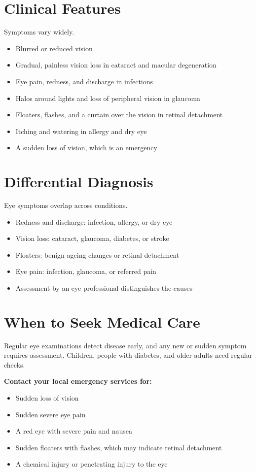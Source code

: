 \section*{Clinical Features}
Symptoms vary widely.
\begin{itemize}
    \item Blurred or reduced vision
    \item Gradual, painless vision loss in cataract and macular degeneration
    \item Eye pain, redness, and discharge in infections
    \item Halos around lights and loss of peripheral vision in glaucoma
    \item Floaters, flashes, and a curtain over the vision in retinal detachment
    \item Itching and watering in allergy and dry eye
    \item A sudden loss of vision, which is an emergency
\end{itemize}

\section*{Differential Diagnosis}
Eye symptoms overlap across conditions.
\begin{itemize}
    \item Redness and discharge: infection, allergy, or dry eye
    \item Vision loss: cataract, glaucoma, diabetes, or stroke
    \item Floaters: benign ageing changes or retinal detachment
    \item Eye pain: infection, glaucoma, or referred pain
    \item Assessment by an eye professional distinguishes the causes
\end{itemize}

\section*{When to Seek Medical Care}
Regular eye examinations detect disease early, and any new or sudden symptom requires assessment. Children, people with diabetes, and older adults need regular checks.

\textbf{Contact your local emergency services for:}
\begin{itemize}
    \item Sudden loss of vision
    \item Sudden severe eye pain
    \item A red eye with severe pain and nausea
    \item Sudden floaters with flashes, which may indicate retinal detachment
    \item A chemical injury or penetrating injury to the eye
\end{itemize}

